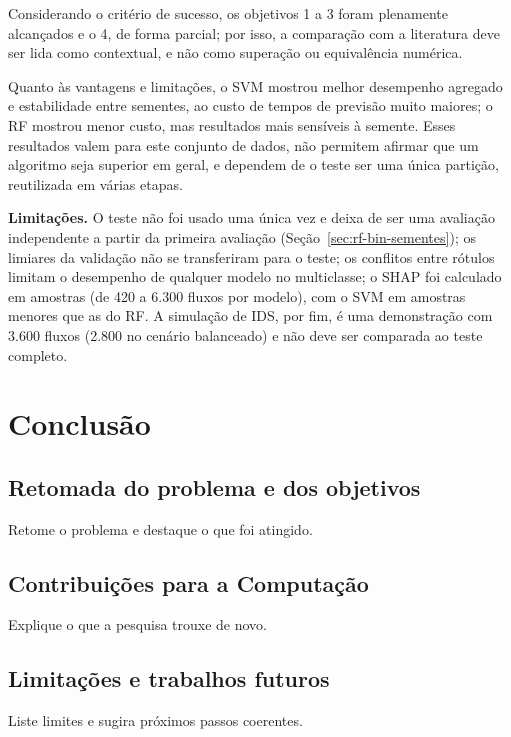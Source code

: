 \documentclass[
    12pt,                %
    openright,           %
    oneside,             %
    a4paper,             %
    english,             %
    brazil               %
]{abntex2}
\begin{document}
Considerando o critério de sucesso, os objetivos 1 a 3 foram plenamente alcançados e o 4, de forma parcial; por isso, a comparação com a literatura deve ser lida como contextual, e não como superação ou equivalência numérica.

Quanto às vantagens e limitações, o SVM mostrou melhor desempenho agregado e estabilidade entre sementes, ao custo de tempos de previsão muito maiores; o RF mostrou menor custo, mas resultados mais sensíveis à semente. Esses resultados valem para este conjunto de dados, não permitem afirmar que um algoritmo seja superior em geral, e dependem de o teste ser uma única partição, reutilizada em várias etapas.

\textbf{Limitações.} O teste não foi usado uma única vez e deixa de ser uma avaliação independente a partir da primeira avaliação (Seção~\ref{sec:rf-bin-sementes}); os limiares da validação não se transferiram para o teste; os conflitos entre rótulos limitam o desempenho de qualquer modelo no multiclasse; o SHAP foi calculado em amostras (de 420 a 6.300 fluxos por modelo), com o SVM em amostras menores que as do RF. A simulação de IDS, por fim, é uma demonstração com 3.600 fluxos (2.800 no cenário balanceado) e não deve ser comparada ao teste completo.

\chapter{Conclusão}

\section{Retomada do problema e dos objetivos}
Retome o problema e destaque o que foi atingido.

\section{Contribuições para a Computação}
Explique o que a pesquisa trouxe de novo.

\section{Limitações e trabalhos futuros}
Liste limites e sugira próximos passos coerentes.

\end{document}
